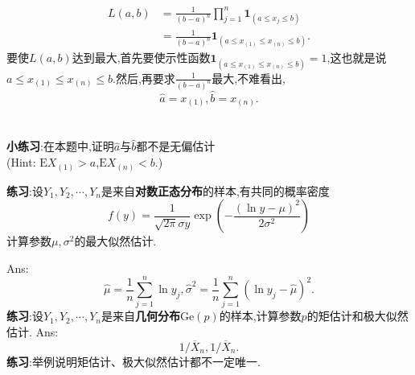 	\begin{frame}
		\begin{equation}
		\begin{split}
			L(a,b) &= \frac{1}{(b-a)^n}\prod_{j=1}^n\bm{1}_{(a\leqslant x_j\leqslant b)} \\
			&=\frac{1}{(b-a)^n}\bm{1}_{(a\leqslant x_{(1)}\leqslant x_{(n)}\leqslant b)}.
		\end{split}
		\end{equation}
		要使$L(a,b)$达到最大,首先要使示性函数$\bm{1}_{(a\leqslant x_{(1)}\leqslant x_{(n)}\leqslant b)} = 1$,这也就是说$a\leqslant x_{(1)}\leqslant x_{(n)}\leqslant b$.然后,再要求$\frac{1}{(b-a)^n}$最大,不难看出,
		\begin{equation}
			\widehat{a} = x_{(1)},\widehat{b} = x_{(n)}.
		\end{equation}
		\\ \hspace*{\fill} \\%
		\textbf{小练习}:在本题中,证明$\widehat{a}$与$\widehat{b}$都不是无偏估计\\
		(Hint: $\mathrm{E}X_{(1)}>a$,$\mathrm{E}X_{(n)}<b$.)
	\end{frame}

	\begin{frame}
		\textbf{练习}:设$Y_1,Y_2,\cdots,Y_n$是来自\textbf{对数正态分布}的样本,有共同的概率密度
		\begin{equation}
			f(y) = \frac{1}{\sqrt{2\pi}\sigma y}\exp\left(-\frac{(\ln y-\mu)^2}{2\sigma^2} \right)
		\end{equation}
		计算参数$\mu,\sigma^2$的最大似然估计.
		
		Ans:\begin{equation}
			\widehat{\mu} = \frac{1}{n}\sum_{j=1}^n\ln y_j,\widehat{\sigma}^2 = \frac{1}{n}\sum_{j=1}^n(\ln y_j - \widehat{\mu})^2.
		\end{equation}
		\textbf{练习}:设$Y_1,Y_2,\cdots,Y_n$是来自\textbf{几何分布$\mathrm{Ge}(p)$}的样本,计算参数$p$的矩估计和极大似然估计.
		Ans:\begin{equation}
			1/\overline{X}_n,1/\overline{X}_n.
		\end{equation}
		\textbf{练习}:举例说明矩估计、极大似然估计都不一定唯一.
	\end{frame}



